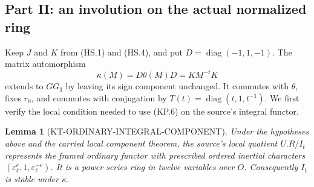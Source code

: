 \documentclass[11pt,a4paper]{article}
\newtheorem{lemma}[theorem]{Lemma}
\theoremstyle{definition}
\begin{document}
\subsection{Part II: an involution on the actual normalized ring}

Keep $J$ and $K$ from (HS.1) and (HS.4), and put
$D=\operatorname{diag}(-1,1,-1)$.  The matrix automorphism
\[
 \kappa(M)=D\theta(M)D=K M^{-t}K                             \tag{KP.6}
\]
extends to $GG_3$ by leaving its sign component unchanged.
It commutes with $\theta$, fixes $r_0$, and commutes with
conjugation by $T(t)=\operatorname{diag}(t,1,t^{-1})$.
We first verify the local condition needed to use (KP.6) on
the source's integral functor.

\begin{lemma}[KT-ORDINARY-INTEGRAL-COMPONENT]
Under the hypotheses above and the carried local component
theorem, the source's local quotient $U.R/I_t$ represents the
framed ordinary functor with prescribed ordered inertial
characters $(\varepsilon_\ell^e,1,\varepsilon_\ell^{-e})$.
It is a power series ring in twelve variables over $O$.
Consequently $I_t$ is stable under $\kappa$.
\end{lemma}
\end{document}
